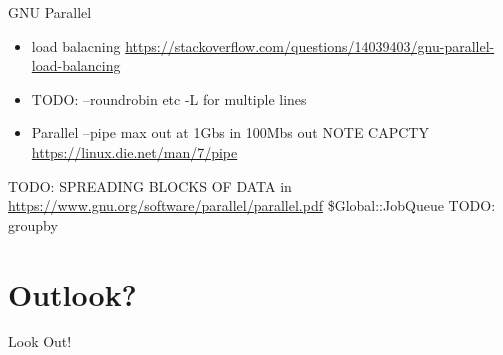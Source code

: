 \begin{frame}{GNU Parallel}
   \begin{itemize}
   \item load balacning \url{https://stackoverflow.com/questions/14039403/gnu-parallel-load-balancing}
   \item TODO: --roundrobin etc -L for multiple lines
   \item Parallel --pipe max out at 1Gbs in 100Mbs out NOTE CAPCTY \url{https://linux.die.net/man/7/pipe}
   \end{itemize}
 TODO: SPREADING BLOCKS OF DATA
 in \url{https://www.gnu.org/software/parallel/parallel.pdf}
 \$Global::JobQueue
 TODO: groupby
\end{frame}

\section{Outlook?}
\begin{frame}{Look Out!}
\end{frame}

